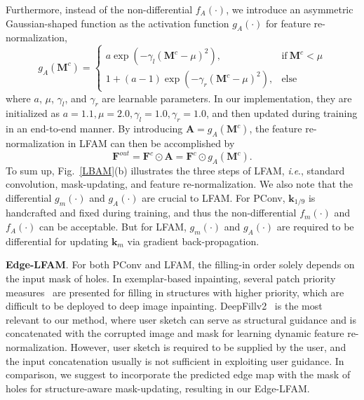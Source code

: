 \documentclass[10pt,journal,compsoc]{IEEEtran}
\newcommand{\ie}{\textit{i}.\textit{e}.}
\begin{document}
Furthermore, instead of the non-differential $f_A(\cdot)$, we introduce an asymmetric Gaussian-shaped function as the activation function $g_A(\cdot)$ for feature re-normalization,
%
\begin{equation}\label{Activation_gA}
	g_A(\mathbf{M}^c) \!=\!
	\begin{cases}
		a \exp\left( - {\gamma_l (\mathbf{M}^c - \mu)^2} \right), & \mbox{if} \ \mathbf{M}^c \!<\! \mu \\
		1 \!+\! (a\!-\!1) \exp\left( - {\gamma_r (\mathbf{M}^c \!-\! \mu)^2} \right), & \mbox{else}
	\end{cases}
\end{equation}
%
where $a$, $\mu$, $\gamma_l$, and $\gamma_r$ are learnable parameters.
%
In our implementation, they are initialized as $a = 1.1, \mu=2.0,\gamma_l = 1.0, \gamma_r = 1.0$, and then updated during training in an end-to-end manner.
%
By introducing $\mathbf{A} = g_A(\mathbf{M}^c)$, the feature re-normalization in LFAM can then be accomplished by
%
\begin{equation}\label{renorm_lfam}
	\mathbf{F}^{out} = \mathbf{F}^{c} \odot \mathbf{A} = \mathbf{F}^{c} \odot g_A(\mathbf{M}^c).
\end{equation}
%
To sum up, Fig.~\ref{LBAM}(b) illustrates the three steps of LFAM, \ie, standard convolution, mask-updating, and feature re-normalization.
%
We also note that the differential $g_m(\cdot)$ and $g_A(\cdot)$ are crucial to LFAM.
%
For PConv, $\mathbf{k}_{{1}/{9}}$ is handcrafted and fixed during training, and thus the non-differential $f_m(\cdot)$ and $f_A(\cdot)$ can be acceptable.
%
But for LFAM, $g_m(\cdot)$ and $g_A(\cdot)$ are required to be differential for updating $\mathbf{k}_{m}$ via gradient back-propagation.



{\textbf{Edge-LFAM}.} For both PConv and LFAM, the filling-in order solely depends on the input mask of holes.
%
In exemplar-based inpainting, several patch priority measures~\cite{criminisi2004region,XuPatchSparsity,LeMeur2011examplar} are presented for filling in structures with higher priority, which are difficult to be deployed to deep image inpainting.
%
DeepFillv2~\cite{yu2018free} is the most relevant to our method, where user sketch can serve as structural guidance and is concatenated with the corrupted image and mask for learning dynamic feature re-normalization.
%
However, user sketch is required to be supplied by the user, and the input concatenation usually is not sufficient in exploiting user guidance.
%
In comparison, we suggest to incorporate the predicted edge map with the mask of holes for structure-aware mask-updating, resulting in our Edge-LFAM.
\end{document}

